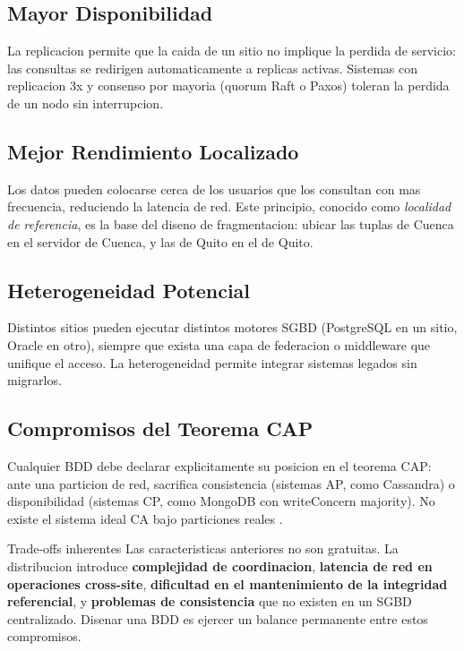 \documentclass[11pt,a4paper]{article}
\begin{document}
\subsection{Mayor Disponibilidad}

La replicacion permite que la caida de un sitio no implique la perdida de servicio: las consultas se redirigen automaticamente a replicas activas. Sistemas con replicacion 3x y consenso por mayoria (quorum Raft o Paxos) toleran la perdida de un nodo sin interrupcion.

\subsection{Mejor Rendimiento Localizado}

Los datos pueden colocarse cerca de los usuarios que los consultan con mas frecuencia, reduciendo la latencia de red. Este principio, conocido como \textit{localidad de referencia}, es la base del diseno de fragmentacion: ubicar las tuplas de Cuenca en el servidor de Cuenca, y las de Quito en el de Quito.

\subsection{Heterogeneidad Potencial}

Distintos sitios pueden ejecutar distintos motores SGBD (PostgreSQL en un sitio, Oracle en otro), siempre que exista una capa de federacion o middleware que unifique el acceso. La heterogeneidad permite integrar sistemas legados sin migrarlos.

\subsection{Compromisos del Teorema CAP}

Cualquier BDD debe declarar explicitamente su posicion en el teorema CAP: ante una particion de red, sacrifica consistencia (sistemas AP, como Cassandra) o disponibilidad (sistemas CP, como MongoDB con writeConcern majority). No existe el sistema ideal CA bajo particiones reales \cite{brewer2012}.

\begin{notebox}{Trade-offs inherentes}
Las caracteristicas anteriores no son gratuitas. La distribucion introduce \textbf{complejidad de coordinacion}, \textbf{latencia de red en operaciones cross-site}, \textbf{dificultad en el mantenimiento de la integridad referencial}, y \textbf{problemas de consistencia} que no existen en un SGBD centralizado. Disenar una BDD es ejercer un balance permanente entre estos compromisos.
\end{notebox}
\end{document}
